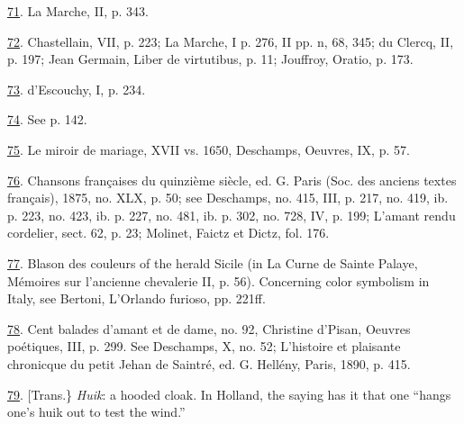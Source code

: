 \protect\hypertarget{23_NOTES.xhtmlux5cux23id_333}{\protect\hyperlink{20_ILLUSTRATIONS_FOLLOW_PAGE.xhtmlux5cux23id_332}{71}}.
La Marche, II, p. 343.

\protect\hypertarget{23_NOTES.xhtmlux5cux23id_331}{\protect\hyperlink{20_ILLUSTRATIONS_FOLLOW_PAGE.xhtmlux5cux23id_330}{72}}.
Chastellain, VII, p. 223; La Marche, I p. 276, II pp. n, 68, 345; du
Clercq, II, p. 197; Jean Germain, Liber de virtutibus, p. 11; Jouffroy,
Oratio, p. 173.

\protect\hypertarget{23_NOTES.xhtmlux5cux23id_329}{\protect\hyperlink{20_ILLUSTRATIONS_FOLLOW_PAGE.xhtmlux5cux23id_328}{73}}.
d'Escouchy, I, p. 234.

\protect\hypertarget{23_NOTES.xhtmlux5cux23id_327}{\protect\hyperlink{20_ILLUSTRATIONS_FOLLOW_PAGE.xhtmlux5cux23id_326}{74}}.
See p. 142.

\protect\hypertarget{23_NOTES.xhtmlux5cux23id_325}{\protect\hyperlink{20_ILLUSTRATIONS_FOLLOW_PAGE.xhtmlux5cux23id_324}{75}}.
Le miroir de mariage, XVII vs. 1650, Deschamps, Oeuvres, IX, p. 57.

\protect\hypertarget{23_NOTES.xhtmlux5cux23id_323}{\protect\hyperlink{20_ILLUSTRATIONS_FOLLOW_PAGE.xhtmlux5cux23id_322}{76}}.
Chansons françaises du quinzième siècle, ed. G. Paris (Soc. des anciens
textes français), 1875, no. XLX, p. 50; see Deschamps, no. 415, III, p.
217, no. 419, ib. p. 223, no. 423, ib. p. 227, no. 481, ib. p. 302, no.
728, IV, p. 199; L'amant rendu cordelier, sect. 62, p. 23; Molinet,
Faictz et Dictz, fol. 176.

\protect\hypertarget{23_NOTES.xhtmlux5cux23id_321}{\protect\hyperlink{20_ILLUSTRATIONS_FOLLOW_PAGE.xhtmlux5cux23id_320}{77}}.
Blason des couleurs of the herald Sicile (in La Curne de Sainte Palaye,
Mémoires sur l'ancienne chevalerie II, p. 56). Concerning color
symbolism in Italy, see Bertoni, L'Orlando furioso, pp. 221ff.

\protect\hypertarget{23_NOTES.xhtmlux5cux23id_319}{\protect\hyperlink{20_ILLUSTRATIONS_FOLLOW_PAGE.xhtmlux5cux23id_318}{78}}.
Cent balades d'amant et de dame, no. 92, Christine d'Pisan, Oeuvres
poétiques, III, p. 299. See Deschamps, X, no. 52; L'histoire et
plaisante chronicque du petit Jehan de Saintré, ed. G. Hellény, Paris,
1890, p. 415.

\protect\hypertarget{23_NOTES.xhtmlux5cux23id_317}{\protect\hyperlink{20_ILLUSTRATIONS_FOLLOW_PAGE.xhtmlux5cux23id_316}{79}}.
{[}Trans.\} \emph{Huik}: a hooded cloak. In Holland, the saying has it
that one ``hangs one's huik out to test the wind.''

